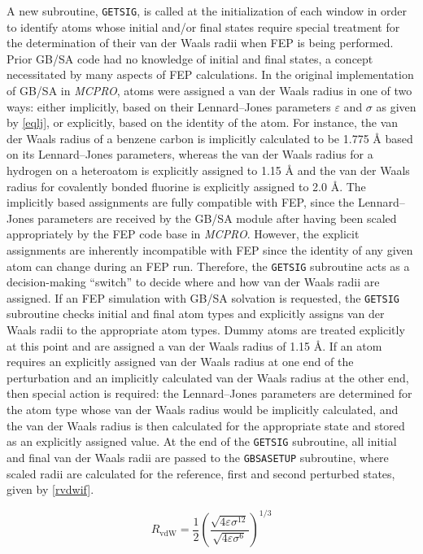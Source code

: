 \documentclass[12pt]{report}
\begin{document}
A new subroutine, {\tt GETSIG}, is called at the initialization of each window in order to identify atoms whose initial and/or final states require special treatment for the determination of their van der Waals radii when FEP is being performed. Prior GB/SA code had no knowledge of initial and final states, a concept necessitated by many aspects of FEP calculations. In the original implementation of GB/SA in \textit{MCPRO}, atoms were assigned a van der Waals radius in one of two ways: either implicitly, based on their Lennard--Jones parameters $\varepsilon$ and $\sigma$ as given by \cref{eqlj}, or explicitly, based on the identity of the atom. For instance, the van der Waals radius of a benzene carbon is implicitly calculated to be 1.775 \AA{} based on its Lennard--Jones parameters, whereas the van der Waals radius for a hydrogen on a heteroatom is explicitly assigned to 1.15 \AA{} and the van der Waals radius for covalently bonded fluorine is explicitly assigned to 2.0 \AA. The implicitly based assignments are fully compatible with FEP, since the Lennard--Jones parameters are received by the GB/SA module after having been scaled appropriately by the FEP code base in \textit{MCPRO}\@. However, the explicit assignments are inherently incompatible with FEP since the identity of any given atom can change during an FEP run. Therefore, the {\tt GETSIG} subroutine acts as a decision-making ``switch'' to decide where and how van der Waals radii are assigned. If an FEP simulation with GB/SA solvation is requested, the {\tt GETSIG} subroutine checks initial and final atom types and explicitly assigns van der Waals radii to the appropriate atom types. Dummy atoms are treated explicitly at this point and are assigned a van der Waals radius of 1.15 \AA. If an atom requires an explicitly assigned van der Waals radius at one end of the perturbation and an implicitly calculated van der Waals radius at the other end, then special action is required: the Lennard--Jones parameters are determined for the atom type whose van der Waals radius would be implicitly calculated, and the van der Waals radius is then calculated for the appropriate state and stored as an explicitly assigned value. At the end of the {\tt GETSIG} subroutine, all initial and final van der Waals radii are passed to the {\tt GBSASETUP} subroutine, where scaled radii are calculated for the reference, first and second perturbed states, given by \cref{rvdwif}.

\vspace*{-.3cm}
\begin{equation}
\label{eqlj}
R_{ \textrm{vdW}} = \frac{1}{2} \left( \frac{\sqrt{4 \varepsilon \sigma^{12}}}{\sqrt{4 \varepsilon \sigma^{6}}} \right)^{1/3}
\end{equation}
\vspace*{-.5cm}
\end{document}
